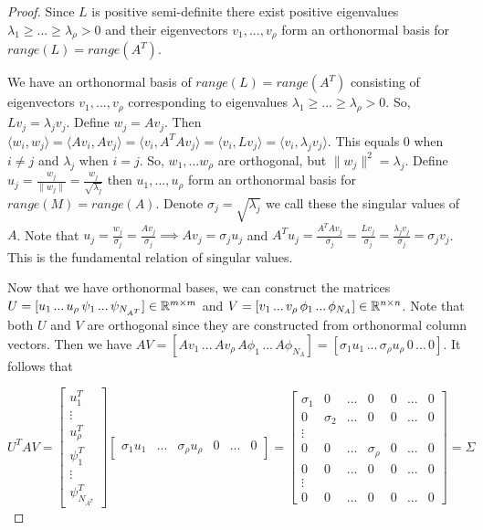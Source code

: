 \begin{proof}
\item Since $L$ is positive semi-definite there exist positive eigenvalues $\lambda_1 \geq ... \geq \lambda_\rho > 0$ and their eigenvectors $v_1, ..., v_\rho$ form an orthonormal basis for $\mathit{range}(L) = \mathit{range}(A^T)$.

\item We have an orthonormal basis of $\mathit{range}(L) = \mathit{range}(A^T)$ consisting of eigenvectors $v_1, ..., v_\rho$ corresponding to eigenvalues $\lambda_1 \geq ... \geq \lambda_\rho > 0$. So, $Lv_j = \lambda_j v_j$. Define $w_j = Av_j$. Then $\langle w_i, w_j \rangle = \langle Av_i, Av_j \rangle = \langle v_i, A^{T}Av_j \rangle = \langle v_i, Lv_j \rangle = \langle v_i, \lambda_j v_j \rangle$. This equals $0$ when $i \neq j$ and $\lambda_j$ when $i = j$. So, $w_1, ... w_\rho$ are orthogonal, but $\|w_j\|^2 = \lambda_j$. Define $u_j = \frac{w_j}{\|w_j\|} = \frac{w_j}{\sqrt{\lambda_j}}$ then $u_1, ..., u_\rho$ form an orthonormal basis for $\mathit{range}(M) = \mathit{range}(A)$. Denote $\sigma_j = \sqrt{\lambda_j}$ we call these the singular values of $A$. Note that $u_j = \frac{w_j}{\sigma_j} = \frac{Av_j}{\sigma_j} \implies Av_j = \sigma_j u_j$ and $A^T u_j = \frac{A^{T}Av_j}{\sigma_j} = \frac{Lv_j}{\sigma_j} = \frac{\lambda_j v_j}{\sigma_j} = \sigma_j v_j$. This is the fundamental relation of singular values.

\item Now that we have orthonormal bases, we can construct the matrices $U = [u_1\, ...\, u_\rho\, \psi_1\, ...\, \psi_{N_{A^T}}] \in \Bbb R^{m \times m} $ and $V = [v_1\, ...\, v_\rho\, \phi_1\, ...\, \phi_{N_A}] \in \Bbb R^{n \times n}$. Note that both $U$ and $V$ are orthogonal since they are constructed from orthonormal column vectors. Then we have $AV = [Av_1\, ...\, Av_\rho\, A\phi_1\, ...\, A\phi_{N_A}] = [\sigma_1 u_1 \, ... \, \sigma_\rho u_\rho \, 0 \, ... \, 0]$. It follows that

\begin{equation}
U^{T}AV = \begin{bmatrix}
		u_{1}^{T} \\
		\vdots \\
		u_{\rho}^{T} \\
		\psi_{1}^{T} \\
		\vdots \\
		\psi_{N_{A^T}}^{T}
	   \end{bmatrix}
\begin{bmatrix}
\sigma_1 u_1 & ... & \sigma_\rho u_\rho & 0 & ... & 0
\end{bmatrix} = 
\begin{bmatrix}
\sigma_1 & 0 & ... & 0 & 0 & ... & 0 \\
0 & \sigma_2 & ... & 0 & 0 & ... & 0 \\
\vdots \\
0 & 0 & ... & \sigma_\rho & 0 & ... & 0 \\
0 & 0 & ... & 0 & 0 & ... & 0 \\
\vdots \\
0 & 0 & ... & 0 & 0 & ... & 0
\end{bmatrix} = \Sigma
\end{equation}


\end{proof}
